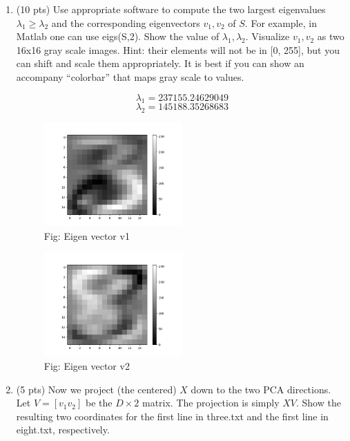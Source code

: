 \documentclass[a4paper]{article}
\theoremstyle{definition}
\newenvironment{soln}{
    \leavevmode\color{blue}\ignorespaces
}{}
\begin{document}
\begin{enumerate}
\item (10 pts) Use appropriate software to compute the two largest eigenvalues $\lambda_1 \ge \lambda_2$ and the corresponding eigenvectors $v_1, v_2$ of $S$.
For example, in Matlab one can use eigs(S,2).  
Show the value of $\lambda_1, \lambda_2$.
Visualize $v_1, v_2$ as two 16x16 gray scale images.
Hint: their elements will not be in [0, 255], but you can shift and scale them appropriately.  It is best if you can show an accompany ``colorbar'' that maps gray scale to values. 

\begin{soln}
$$ \lambda_1 = 237155.24629049 $$
$$ \lambda_2 = 145188.35268683 $$

\begin{figure}[H]
	        \centering
	        \includegraphics[width=0.5\textwidth]{4V1.png}
	        \captionsetup{labelformat=empty}
	        \caption{Fig: Eigen vector v1}
	        \label{fig:Eigen vector v1}
\end{figure}

\begin{figure}[H]
	        \centering
	        \includegraphics[width=0.5\textwidth]{4V2.png}
	        \captionsetup{labelformat=empty}
	        \caption{Fig: Eigen vector v2}
	        \label{fig:Eigen vector v2}
\end{figure}
\end{soln}



\item (5 pts) Now we project (the centered) $X$ down to the two PCA directions.   Let $V=[v_1 v_2]$ be the $D\times 2$ matrix.  The projection is simply $XV$.
Show the resulting two coordinates for the first line in three.txt and the first line in eight.txt, respectively.


\end{enumerate}
\end{document}
